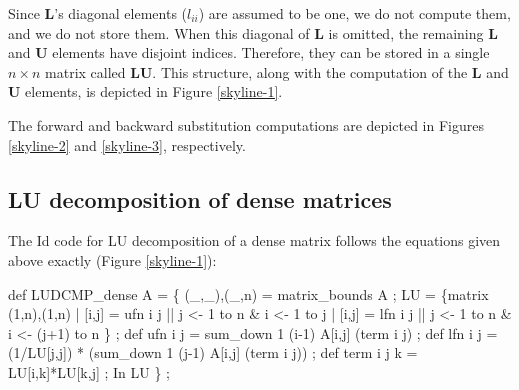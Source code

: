 Since {\bf L}'s diagonal elements ($l_{ii}$) are assumed to be one, we
do not compute them, and we do not store them.  When this diagonal of
{\bf L} is omitted, the remaining {\bf L} and {\bf U} elements have
disjoint indices.  Therefore, they can be stored in a single $n \times
n$ matrix called {\bf LU}.  This structure, along with the computation
of the {\bf L} and {\bf U} elements, is depicted in Figure
\ref{skyline-1}.

 \begin{figure}[htbp]
 \end{figure}

The forward and backward substitution computations are depicted in
Figures \ref{skyline-2} and \ref{skyline-3}, respectively.

 \begin{figure}[htbp]
 \end{figure}

 \begin{figure}[htbp]
 \end{figure}


\subsection{LU decomposition of dense matrices}

The Id code for LU decomposition of a dense matrix follows the
equations given above exactly (Figure \ref{skyline-1}):

\begin{minipage}{\textwidth}
 \begin{idenv}
def LUDCMP\_dense A =
  \{ (\_,\_),(\_,n) = matrix\_bounds A ;
\null
    LU = \{matrix (1,n),(1,n)
          | [i,j] = ufn i j || j <- 1 to n & i <- 1 to j         %
          | [i,j] = lfn i j || j <- 1 to n & i <- (j+1) to n \} ; %
\null
    def ufn i j = sum\_down 1 (i-1) A[i,j] (term i j) ;           %
\null
    def lfn i j = (1/LU[j,j]) * (sum\_down 1 (j-1) A[i,j] (term i j)) ; %
\null
    def term i j k = LU[i,k]*LU[k,j] ;
   In
     LU \} ;
 \end{idenv}
\end{minipage}


